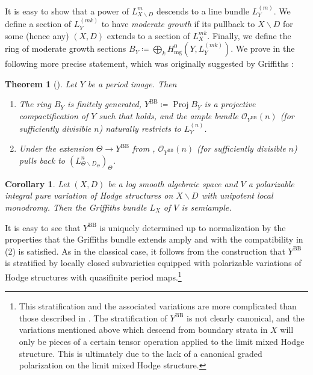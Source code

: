 \documentclass{amsart}
\newcommand{\bs}{\backslash}
\newcommand{\proj}{\operatorname{Proj}}
\newtheorem{cor}[theorem]{Corollary}
\newtheorem{thm}[theorem]{Theorem}
\theoremstyle{definition}
\theoremstyle{remark}
\def\cO{\mathcal{O}}
\def\BB{\mathrm{BB}}
\def\bdd{\mathrm{mg}}
\numberwithin{equation}{section}
\def\testsp{\Theta}
\begin{document}
It is easy to show \cite[Lem 6.12]{BBT23} that a power of $L_{X\bs D}^m$ descends to a line bundle $L^{(m)}_Y$. We define a section of $L^{(mk)}_Y$ to have \textit{moderate growth} if its pullback to $X\bs D$ for some (hence any) $(X,D)$ extends to a section of $L_X^{mk}$. Finally, we define the ring of moderate growth sections
$B_Y\coloneqq  \bigoplus_k H^0_{\bdd}(Y,L^{(mk)}_Y)$. We prove in  the following more precise statement, which was originally suggested by Griffiths \cite[(10.7) Remark]{G70Summary}:

\begin{thm}[]\label{thm:BBmain2}
Let $Y$ be a period image.  Then

\begin{enumerate}

\item The ring $B_Y$ is finitely generated, $Y^{\BB}\coloneqq  \proj B_Y$ is a projective compactification of $Y$ such that  holds, and the ample bundle $\cO_{Y^\BB}(n)$ (for sufficiently divisible $n$) naturally restricts to $L_Y^{(n)}$.  
\item Under the extension $\testsp\to Y^\BB$ from , $\cO_{Y^\BB}(n)$ (for sufficiently divisible $n$) pulls back to $(L^n_{\testsp\bs D_\testsp})_\testsp$.

\end{enumerate}

\end{thm}
\begin{cor}\label{cor:BB}Let $(X,D)$ be a log smooth algebraic space and $V$ a polarizable integral pure variation of Hodge structures on $X\bs D$ with unipotent local monodromy.  Then the Griffiths bundle $L_X$ of $V$ is semiample.
\end{cor}

It is easy to see that $Y^\BB$ is uniquely determined up to normalization by the properties that the Griffiths bundle extends amply and  with the compatibility in (2) is satisfied.  As in the classical case, it follows from the construction that $Y^\BB$ is stratified by locally closed subvarieties equipped with polarizable variations of Hodge structures with quasifinite period maps.\footnote{This stratification and the associated variations are more complicated than those described in \cite{GGLR17}.  The stratification of $Y^\BB$ is not clearly canonical, and the variations mentioned above which descend from boundary strata in $X$ will only be pieces of a certain tensor operation applied to the limit mixed Hodge structure. This is ultimately due to the lack of a canonical graded polarization on the limit mixed Hodge structure.}
\end{document}

